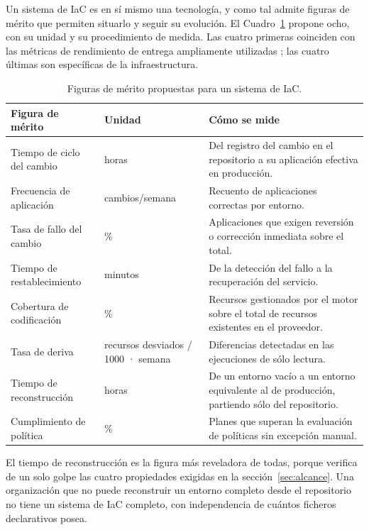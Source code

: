 \documentclass[11pt,letterpaper]{article}
\begin{document}
Un sistema de IaC es en sí mismo una tecnología, y como tal admite figuras de
mérito que permiten situarlo y seguir su evolución. El
Cuadro~\ref{tab:fom} propone ocho, con su unidad y su procedimiento de
medida. Las cuatro primeras coinciden con las métricas de rendimiento de
entrega ampliamente utilizadas \parencite{forsgren2018}; las cuatro últimas
son específicas de la infraestructura.

\begin{table}[htbp]
  \centering
  \footnotesize
  \caption{Figuras de mérito propuestas para un sistema de IaC.}
  \label{tab:fom}
  \begin{tabularx}{\textwidth}{@{}>{\raggedright\arraybackslash}p{}
    >{\raggedright\arraybackslash}p{}
    >{\raggedright\arraybackslash}X@{}}
    \toprule
    \textbf{Figura de mérito} & \textbf{Unidad} & \textbf{Cómo se mide} \\
    \midrule
    Tiempo de ciclo del cambio & horas & Del registro del cambio en el
      repositorio a su aplicación efectiva en producción. \\
    Frecuencia de aplicación & cambios/semana & Recuento de aplicaciones
      correctas por entorno. \\
    Tasa de fallo del cambio & \% & Aplicaciones que exigen reversión o
      corrección inmediata sobre el total. \\
    Tiempo de restablecimiento & minutos & De la detección del fallo a la
      recuperación del servicio. \\
    Cobertura de codificación & \% & Recursos gestionados por el motor sobre
      el total de recursos existentes en el proveedor. \\
    Tasa de deriva & recursos desviados / 1000 · semana & Diferencias
      detectadas en las ejecuciones de sólo lectura. \\
    Tiempo de reconstrucción & horas & De un entorno vacío a un entorno
      equivalente al de producción, partiendo sólo del repositorio. \\
    Cumplimiento de política & \% & Planes que superan la evaluación de
      políticas sin excepción manual. \\
    \bottomrule
  \end{tabularx}
\end{table}

El tiempo de reconstrucción es la figura más reveladora de todas, porque
verifica de un solo golpe las cuatro propiedades exigidas en la
sección~\ref{sec:alcance}. Una
organización que no puede reconstruir un entorno completo desde el repositorio
no tiene un sistema de IaC completo, con independencia de cuántos ficheros
declarativos posea.
\end{document}
